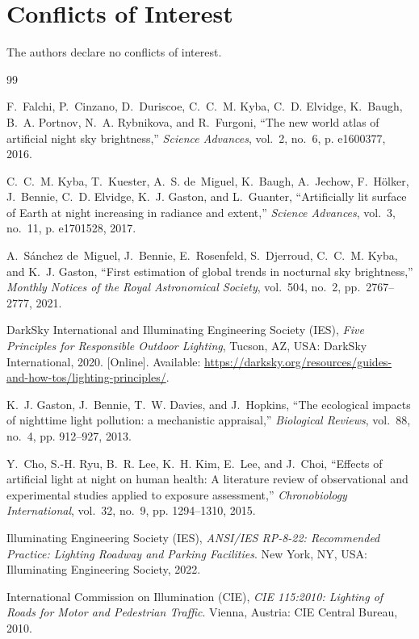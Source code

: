\documentclass[11pt,a4paper]{article}
\begin{document}
\section*{Conflicts of Interest}
The authors declare no conflicts of interest.

\begin{thebibliography}{99}

F.~Falchi, P.~Cinzano, D.~Duriscoe, C.~C.~M. Kyba, C.~D. Elvidge, K.~Baugh, B.~A. Portnov, N.~A. Rybnikova, and R.~Furgoni, ``The new world atlas of artificial night sky brightness,'' \emph{Science Advances}, vol.~2, no.~6, p. e1600377, 2016.

C.~C.~M. Kyba, T.~Kuester, A.~S. de~Miguel, K.~Baugh, A.~Jechow, F.~H{\"o}lker, J.~Bennie, C.~D. Elvidge, K.~J. Gaston, and L.~Guanter, ``Artificially lit surface of Earth at night increasing in radiance and extent,'' \emph{Science Advances}, vol.~3, no.~11, p. e1701528, 2017.

A.~S{\'a}nchez de~Miguel, J.~Bennie, E.~Rosenfeld, S.~Djerroud, C.~C.~M. Kyba, and K.~J. Gaston, ``First estimation of global trends in nocturnal sky brightness,'' \emph{Monthly Notices of the Royal Astronomical Society}, vol.~504, no.~2, pp.~2767--2777, 2021.

DarkSky International and Illuminating Engineering Society (IES), \emph{Five Principles for Responsible Outdoor Lighting}, Tucson, AZ, USA: DarkSky International, 2020. [Online]. Available: \url{https://darksky.org/resources/guides-and-how-tos/lighting-principles/}.

K.~J. Gaston, J.~Bennie, T.~W. Davies, and J.~Hopkins, ``The ecological impacts of nighttime light pollution: a mechanistic appraisal,'' \emph{Biological Reviews}, vol.~88, no.~4, pp. 912--927, 2013.

Y.~Cho, S.-H. Ryu, B.~R. Lee, K.~H. Kim, E.~Lee, and J.~Choi, ``Effects of artificial light at night on human health: A literature review of observational and experimental studies applied to exposure assessment,'' \emph{Chronobiology International}, vol.~32, no.~9, pp. 1294--1310, 2015.

Illuminating Engineering Society (IES), \emph{ANSI/IES RP-8-22: Recommended Practice: Lighting Roadway and Parking Facilities}. New York, NY, USA: Illuminating Engineering Society, 2022.

International Commission on Illumination (CIE), \emph{CIE 115:2010: Lighting of Roads for Motor and Pedestrian Traffic}. Vienna, Austria: CIE Central Bureau, 2010.


\end{thebibliography}
\end{document}
